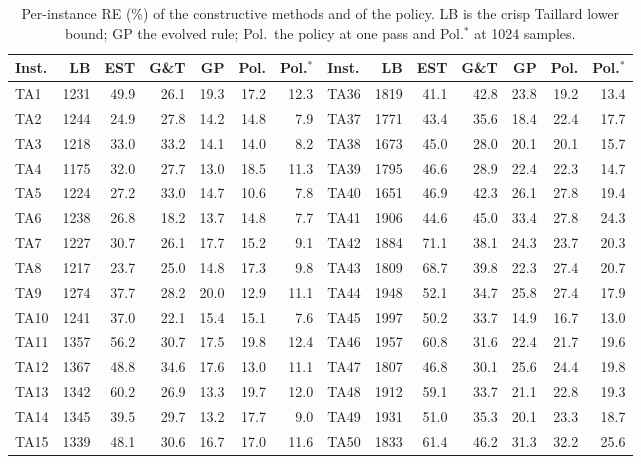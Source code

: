 \documentclass[preprint,12pt]{elsarticle}
\begin{document}
\begin{table}[h]
\centering\scriptsize
\caption{Per-instance RE (\%) of the constructive methods and of the
policy. LB is the crisp Taillard lower bound; GP the evolved rule;
Pol.\ the policy at one pass and Pol.$^{\ast}$ at 1024 samples.}
\label{sup:tab-perinstance}
\renewcommand{\arraystretch}{0.92}
\setlength{\tabcolsep}{3pt}
\begin{tabular}{lrrrrrr@{\hskip 0.7em}|@{\hskip 0.7em}lrrrrrr}
\toprule
Inst. & LB & EST & G\&T & GP & Pol. & Pol.$^{\ast}$ &
Inst. & LB & EST & G\&T & GP & Pol. & Pol.$^{\ast}$ \\
\midrule
TA1 & 1231 & 49.9 & 26.1 & 19.3 & 17.2 & 12.3 & TA36 & 1819 & 41.1 & 42.8 & 23.8 & 19.2 & 13.4 \\
TA2 & 1244 & 24.9 & 27.8 & 14.2 & 14.8 & 7.9 & TA37 & 1771 & 43.4 & 35.6 & 18.4 & 22.4 & 17.7 \\
TA3 & 1218 & 33.0 & 33.2 & 14.1 & 14.0 & 8.2 & TA38 & 1673 & 45.0 & 28.0 & 20.1 & 20.1 & 15.7 \\
TA4 & 1175 & 32.0 & 27.7 & 13.0 & 18.5 & 11.3 & TA39 & 1795 & 46.6 & 28.9 & 22.4 & 22.3 & 14.7 \\
TA5 & 1224 & 27.2 & 33.0 & 14.7 & 10.6 & 7.8 & TA40 & 1651 & 46.9 & 42.3 & 26.1 & 27.8 & 19.4 \\
TA6 & 1238 & 26.8 & 18.2 & 13.7 & 14.8 & 7.7 & TA41 & 1906 & 44.6 & 45.0 & 33.4 & 27.8 & 24.3 \\
TA7 & 1227 & 30.7 & 26.1 & 17.7 & 15.2 & 9.1 & TA42 & 1884 & 71.1 & 38.1 & 24.3 & 23.7 & 20.3 \\
TA8 & 1217 & 23.7 & 25.0 & 14.8 & 17.3 & 9.8 & TA43 & 1809 & 68.7 & 39.8 & 22.3 & 27.4 & 20.7 \\
TA9 & 1274 & 37.7 & 28.2 & 20.0 & 12.9 & 11.1 & TA44 & 1948 & 52.1 & 34.7 & 25.8 & 27.4 & 17.9 \\
TA10 & 1241 & 37.0 & 22.1 & 15.4 & 15.1 & 7.6 & TA45 & 1997 & 50.2 & 33.7 & 14.9 & 16.7 & 13.0 \\
TA11 & 1357 & 56.2 & 30.7 & 17.5 & 19.8 & 12.4 & TA46 & 1957 & 60.8 & 31.6 & 22.4 & 21.7 & 19.6 \\
TA12 & 1367 & 48.8 & 34.6 & 17.6 & 13.0 & 11.1 & TA47 & 1807 & 46.8 & 30.1 & 25.6 & 24.4 & 19.8 \\
TA13 & 1342 & 60.2 & 26.9 & 13.3 & 19.7 & 12.0 & TA48 & 1912 & 59.1 & 33.7 & 21.1 & 22.8 & 19.3 \\
TA14 & 1345 & 39.5 & 29.7 & 13.2 & 17.7 & 9.0 & TA49 & 1931 & 51.0 & 35.3 & 20.1 & 23.3 & 18.7 \\
TA15 & 1339 & 48.1 & 30.6 & 16.7 & 17.0 & 11.6 & TA50 & 1833 & 61.4 & 46.2 & 31.3 & 32.2 & 25.6 \\

\end{tabular}
\end{table}
\end{document}
